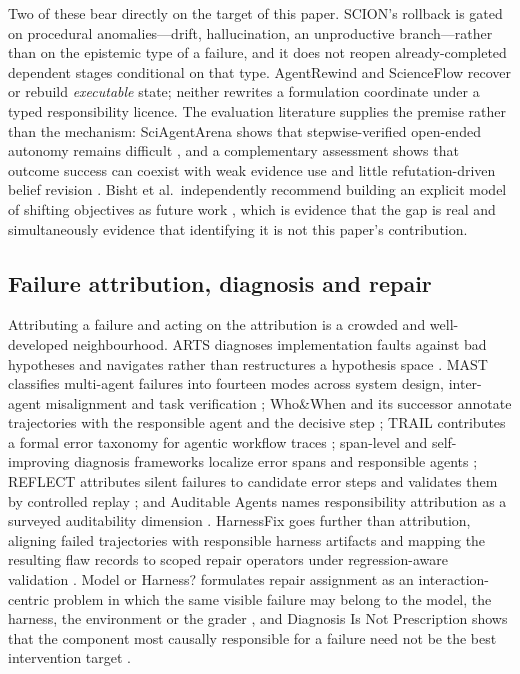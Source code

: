 Two of these bear directly on the target of this paper. SCION's rollback is
gated on procedural anomalies---drift, hallucination, an unproductive
branch---rather than on the epistemic type of a failure, and it does not reopen
already-completed dependent stages conditional on that type. AgentRewind and
ScienceFlow recover or rebuild \emph{executable} state; neither rewrites a
formulation coordinate under a typed responsibility licence. The evaluation
literature supplies the premise rather than the mechanism: SciAgentArena shows
that stepwise-verified open-ended autonomy remains difficult
\cite{sciagentarena2026}, and a complementary assessment shows that outcome
success can coexist with weak evidence use and little refutation-driven belief
revision \cite{scientificreasoning2026}. Bisht et al.\ independently recommend
building an explicit model of shifting objectives as future work
\cite{bisht2026}, which is evidence that the gap is real and simultaneously
evidence that identifying it is not this paper's contribution.

\subsection{Failure attribution, diagnosis and repair}

Attributing a failure and acting on the attribution is a crowded and
well-developed neighbourhood. ARTS diagnoses implementation faults against bad
hypotheses and navigates rather than restructures a hypothesis space
\cite{arts2026}. MAST classifies multi-agent failures into fourteen modes across
system design, inter-agent misalignment and task verification \cite{mast2025};
Who\&When and its successor annotate trajectories with the responsible agent and
the decisive step \cite{whowhen2025,whowhenpro2026}; TRAIL contributes a formal
error taxonomy for agentic workflow traces \cite{trail2025}; span-level and
self-improving diagnosis frameworks localize error spans and responsible agents
\cite{spanlevel2026,selfimproving2026}; REFLECT attributes silent failures to
candidate error steps and validates them by controlled replay
\cite{reflect2026}; and Auditable Agents names responsibility attribution as a
surveyed auditability dimension \cite{auditable2026}. HarnessFix goes further
than attribution, aligning failed trajectories with responsible harness
artifacts and mapping the resulting flaw records to scoped repair operators
under regression-aware validation \cite{harnessfix2026}. Model or Harness?
formulates repair assignment as an interaction-centric problem in which the same
visible failure may belong to the model, the harness, the environment or the
grader \cite{modelorharness2026}, and Diagnosis Is Not Prescription shows that
the component most causally responsible for a failure need not be the best
intervention target \cite{diagnosisnotprescription2026}.

